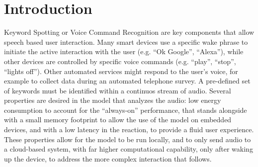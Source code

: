 
\section{Introduction}
\label{sec:introduction}


Keyword Spotting or Voice Command Recognition are key components that allow
speech based user interaction.
%
Many smart devices use a specific wake phrase to initiate the active
interaction with the user (e.g. ``Ok Google'', ``Alexa''), while other devices
are controlled by specific voice commands (e.g. ``play'', ``stop'', ``lights
off'').
%
Other automated services might respond to the user's voice, for example to
collect data during an automated telephone survey.
%
A pre-defined set of keywords must be identified within a continuos stream of
audio. Several properties are desired in the model that analyzes the audio: low
energy consumption to account for the ``always-on'' performance, that stands
alongside with a small memory footprint to allow the use of the model on
embedded devices, and with a low latency in the reaction, to provide a fluid
user experience.
%
These properties allow for the model to be run locally, and to only send audio
to a cloud-based system, with far higher computational capability, only after
waking up the device, to address the more complex interaction that follows.


